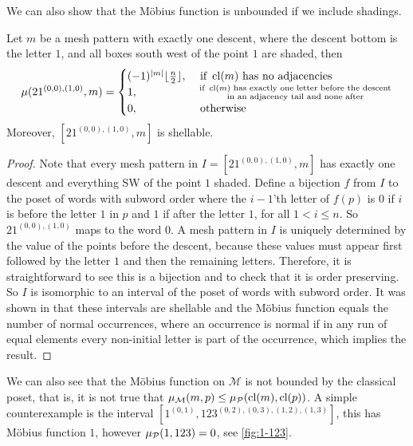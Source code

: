 \documentclass[11pt,a4paper,oneside]{article}
\begin{document}
We can also show that the M\"obius function is unbounded if we include shadings.
\begin{lem}\label{lem:mobUn}
Let $m$ be a mesh pattern with exactly one descent, where the descent bottom is
the letter $1$, and all boxes south west of the point $1$ are shaded, then
$$
\mu(21^{(0,0),(1,0)},m)=\begin{cases}
(-1)^{|m|}\lfloor\frac{n}{2}\rfloor,&\mbox{ if } \operatorname{\textrm{cl}}(m) \mbox{ has no adjacencies}\\
1,&\substack{ \text{ if } \operatorname{\textrm{cl}}(m) \text{ has exactly one letter before the descent} \\
\text{ in an adjacency tail and none after}}\\
0, &\mbox{ otherwise}
\end{cases}
$$
Moreover, $[21^{(0,0),(1,0)},m]$ is shellable.
\begin{proof}
Note that every mesh pattern in $I=[21^{(0,0),(1,0)},m]$ has exactly one descent
and everything SW of the point $1$ shaded. Define a bijection $f$ from $I$ to
the poset of words with subword order where the $i-1$'th letter of $f(p)$ is $0$
if $i$ is before the letter $1$ in $p$ and $1$ if after the letter $1$, for all
$1<i\le n$. So $21^{(0,0),(1,0)}$ maps to the word $0$. A mesh pattern in $I$ is
uniquely determined by the value of the points before the descent, because these
values must appear first followed by the letter $1$ and then the remaining
letters. Therefore, it is straightforward to see this is a bijection and to
check that it is order preserving. So $I$ is isomorphic to an interval of the
poset of words with subword order. It was shown in \cite{Bjo90} that these
intervals are shellable and the M\"obius function equals the number of normal
occurrences, where an occurrence is normal if in any run of equal elements every
non-initial letter is part of the occurrence, which implies the result.
\end{proof}
\end{lem}

We can also see that the M\"obius function on $\mathcal{M}$ is not bounded by
the classical poset, that is, it is not true that $\operatorname{\mu_\mathcal{M}}(m,p)\le
\operatorname{\mu_\mathcal{P}}(\operatorname{\textrm{cl}}(m),\operatorname{\textrm{cl}}(p))$. A simple counterexample is the interval
$[1^{(0,1)},123^{(0,2),(0,3),(1,2),(1,3)}]$, this has M\"obius function $1$,
however $\operatorname{\mu_\mathcal{P}}(1,123)=0$, see \cref{fig:1-123}.
\end{document}
